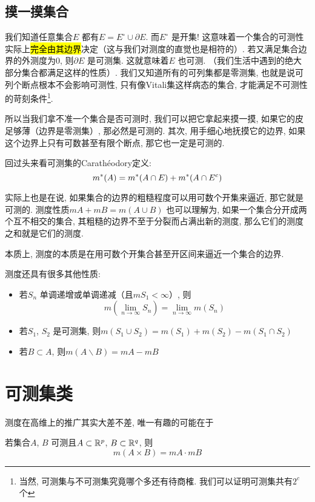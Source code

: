 \subsection{摸一摸集合}
我们知道任意集合\(E\) 都有\(E=E^{\circ} \cup \partial E\).
而\(E^{\circ}\) 是开集!
这意味着一个集合的可测性实际上\hl{完全由其边界}决定（这与我们对测度的直觉也是相符的）. 若又满足集合边界的外测度为0,
则\(\partial E\) 是可测集. 这就意味着\(E\) 也可测.
（我们生活中遇到的绝大部分集合都满足这样的性质）. 我们又知道所有的可列集都是零测集,
也就是说可列个断点根本不会影响可测性, 只有像Vitali集这样病态的集合,
才能满足不可测性的苛刻条件\footnote{当然, 可测集与不可测集究竟哪个多还有待商榷.
我们可以证明可测集共有\(2^{c}\) 个}.

所以当我们拿不准一个集合是否可测时, 我们可以把它拿起来摸一摸, 如果它的皮足够薄（边界是零测集）, 那必然是可测的. 其次,
用手细心地抚摸它的边界, 如果这个边界上只有可数甚至有限个断点, 那它也一定是可测的.

回过头来看可测集的Carathéodory定义: \[
    m^{*}(A)=m^{*}(A\cap E)+m^{*}(A\cap E^{c})
\]

实际上也是在说, 如果集合的边界的粗糙程度可以用可数个开集来逼近, 那它就是可测的.
测度性质\(mA+mB=m(A\cup B)\) 也可以理解为, 如果一个集合分开成两个互不相交的集合,
其粗糙的边界不至于分裂而占满出新的测度, 那么它们的测度之和就是它们的测度.

本质上, 测度的本质是在用可数个开集合甚至开区间来逼近一个集合的边界.

测度还具有很多其他性质:
\begin{itemize}
    \item 若\({S_{n}}\) 单调递增或单调递减（且\(mS_{1}<\infty\)）,
        则\[m(\lim_{n \to \infty} S_{n})=\lim_{n\to
        \infty} m(S_{n})\]
    \item 若\(S_{1}\), \(S_{2}\) 是可测集, 则\(
        m(S_{1}\cup S_{2})=m(S_{1})+m(S_{2})-m(S_{1}\cap S_{2})\)
    \item 若\(B \subset A\), 则\(m(A \backslash B)=mA-mB\)
\end{itemize}
\section{可测集类}

测度在高维上的推广其实大差不差, 唯一有趣的可能在于

\begin{theorem}
    若集合\(A\), \(B\) 可测且\(A\subset \mathbb{R}^{p}\), \(B \subset \mathbb{R}^{q} \), 则\[
        m(A\times B)=mA \cdot mB
    \]
\end{theorem}

